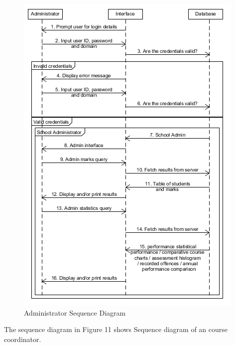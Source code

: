 	
	\begin{center}
		\begin{figure}[h]
			\centering
			\includegraphics[trim={0cm 0cm 0cm 0cm },clip,scale = 1.1]{AdministratorSequence}
			\caption{ Administrator Sequence Diagram}
		\end{figure}
	\end{center}
	\newpage
	
		The sequence diagram in Figure 11 shows Sequence diagram of an course coordinator.  
	
